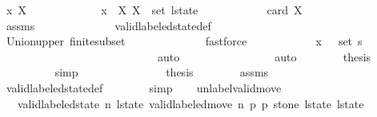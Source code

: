 \begin{isabellebody}
\ x\ X\isanewline
\ \ \ \ \ \ \ \ \ \ \isamarkupfalse%
\ {\isacharasterisk}{\isacharcolon}\ {\isachardoublequoteopen}x\ {\isasymin}\ X{\isachardoublequoteclose}\ {\isachardoublequoteopen}X\ {\isasymin}\ set\ l{\isacharunderscore}state{\isachardoublequoteclose}\isanewline
\ \ \ \ \ \ \ \ \ \ \isamarkupfalse%
\ {\isachardoublequoteopen}card\ X\ {\isasymnoteq}\ {}{\isachardoublequoteclose}\isanewline
\ \ \ \ \ \ \ \ \ \ \ \ \isamarkupfalse%
\ assms\isanewline
\ \ \ \ \ \ \ \ \ \ \ \ \isamarkupfalse%
\ valid{\isacharunderscore}labeled{\isacharunderscore}state{\isacharunderscore}def\isanewline
\ \ \ \ \ \ \ \ \ \ \ \ \isamarkupfalse%
\ Union{\isacharunderscore}upper\ finite{\isacharunderscore}subset\isanewline
\ \ \ \ \ \ \ \ \ \ \ \ \isamarkupfalse%
\ fastforce\isanewline
\ \ \ \ \ \ \ \ \ \ \isamarkupfalse%
\ {\isachardoublequoteopen}x\ {\isasymin}\ {\isasymUnion}\ {\isacharparenleft}set\ {\isacharquery}s{\isacharparenright}{\isachardoublequoteclose}\isanewline
\ \ \ \ \ \ \ \ \ \ \ \ \isamarkupfalse%
\ {\isacharasterisk}\isanewline
\ \ \ \ \ \ \ \ \ \ \ \ \isamarkupfalse%
\ auto\isanewline
\ \ \ \ \ \ \ \ \isamarkupfalse%
\isanewline
\ \ \ \ \ \ \isamarkupfalse%
\ auto\isanewline
\ \ \ \ \ \ \isamarkupfalse%
\ {\isacharquery}thesis\isanewline
\ \ \ \ \ \ \ \ \isamarkupfalse%
\ simp\isanewline
\ \ \ \ \isamarkupfalse%
\isanewline
\ \ \ \ \isamarkupfalse%
\isanewline
\ \ \ \ \isamarkupfalse%
\ {\isacharquery}thesis\isanewline
\ \ \ \ \ \ \isamarkupfalse%
\ assms\isanewline
\ \ \ \ \ \ \isamarkupfalse%
\ valid{\isacharunderscore}labeled{\isacharunderscore}state{\isacharunderscore}def\isanewline
\ \ \ \ \ \ \isamarkupfalse%
\ simp\isanewline
\ \ \isamarkupfalse%
\isanewline
{}\isamarkupfalse%
%
\endisatagproof
{\isafoldproof}%
%
\isadelimproof
\isanewline
%
\endisadelimproof
\isanewline
{}\isamarkupfalse%
\ unlabel{\isacharunderscore}valid{\isacharunderscore}move{\isacharprime}{\isacharcolon}\isanewline
\ \ \ {\isachardoublequoteopen}valid{\isacharunderscore}labeled{\isacharunderscore}state\ n\ l{\isacharunderscore}state{\isachardoublequoteclose}\ {\isachardoublequoteopen}valid{\isacharunderscore}labeled{\isacharunderscore}move{\isacharprime}\ n\ p{}\ p{}\ stone\ l{\isacharunderscore}state\ l{\isacharunderscore}state{\isacharprime}{\isachardoublequoteclose}\isanewline

\end{isabellebody}
